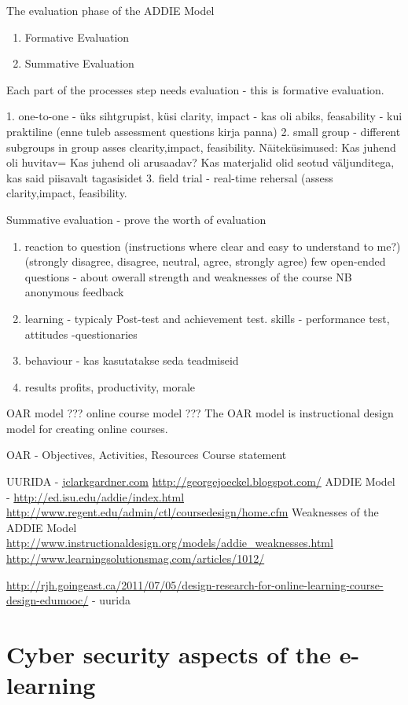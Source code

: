The evaluation phase of the ADDIE Model
\begin{enumerate}
\item Formative Evaluation
\item Summative Evaluation
\end{enumerate}

Each part of the processes step needs evaluation - this is formative evaluation.

1. one-to-one - üks sihtgrupist, küsi clarity, impact - kas oli abiks, feasability - kui praktiline (enne tuleb assessment questions kirja panna)
2. small group  - different subgroups in group asses clearity,impact, feasibility. Näiteküsimused: Kas juhend oli huvitav= Kas juhend oli arusaadav? Kas materjalid olid seotud väljunditega, kas said piisavalt tagasisidet
3. field trial -  real-time rehersal (assess clarity,impact, feasibility.

Summative evaluation - prove the worth of evaluation
\begin{enumerate}
\item reaction to question (instructions where clear and easy to understand to me?) (strongly disagree, disagree, neutral, agree, strongly agree) few open-ended questions - about owerall strength and weaknesses of the course NB anonymous feedback
\item learning - typicaly Post-test and achievement test. skills - performance test, attitudes -questionaries
\item behaviour - kas kasutatakse seda teadmiseid
\item results profits, productivity, morale
\end{enumerate}


{\color{red} OAR model ??? online course model ??? }
The OAR model is instructional design model for creating online courses.

OAR - Objectives, Activities, Resources
Course statement


{\color{red} UURIDA } - \url{jclarkgardner.com} \url{http://georgejoeckel.blogspot.com/}
ADDIE Model - \url{http://ed.isu.edu/addie/index.html}
\url{http://www.regent.edu/admin/ctl/coursedesign/home.cfm}
Weaknesses of the ADDIE Model \url{http://www.instructionaldesign.org/models/addie_weaknesses.html}
\url{http://www.learningsolutionsmag.com/articles/1012/}

\url{http://rjh.goingeast.ca/2011/07/05/design-research-for-online-learning-course-design-edumooc/} - uurida


\section{Cyber security aspects of the e-learning}

